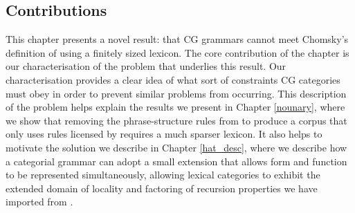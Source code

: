 \documentclass{article}
\newcommand{\cf}[1]{\mbox{$\it{#1}$}}   %
\newcommand{\cg}{CG\xspace}
\begin{document}
\subsection{Contributions}

This chapter presents a novel result: that \cg grammars cannot meet Chomsky's definition of  using a finitely sized lexicon. The core contribution of the chapter is our characterisation of the problem that underlies this result. Our characterisation provides a clear idea of what sort of constraints \cg categories must obey in order to prevent similar problems from occurring. This description of the problem helps explain the results we present in Chapter \ref{nounary}, where we show that removing the phrase-structure rules from \ccgbank to produce a corpus that only uses rules licensed by \ccg requires a much sparser lexicon. It also helps to motivate the solution we describe in Chapter \ref{hat_desc}, where we describe how a categorial grammar can adopt a small extension that allows form and function to be represented simultaneously, allowing lexical categories to exhibit the extended domain of locality and factoring of recursion properties we have imported from \ltag.


% 
% 
% 
\end{document}
